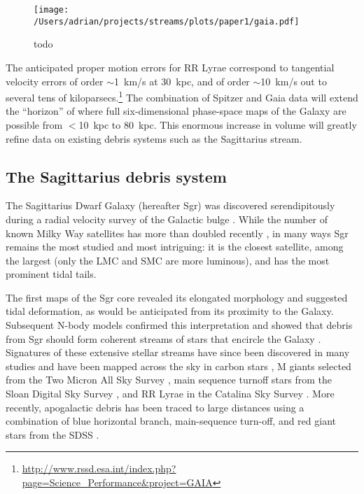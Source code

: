 \documentclass[preprint]{aastex}
\begin{document}
\begin{figure}[h]
\begin{center}
\texttt{[image: /Users/adrian/projects/streams/plots/paper1/gaia.pdf]}
\caption{ todo }\label{fig:gaia_errors}
\end{center}
\end{figure}

The anticipated proper motion errors for RR Lyrae correspond to
tangential velocity errors of order $\sim$1~km/s at 30~kpc, and of
order $\sim$10~km/s out to several tens of
kiloparsecs.\footnote{\url{http://www.rssd.esa.int/index.php?page=Science_Performance&project=GAIA}}
The combination of Spitzer and Gaia data will extend the ``horizon''
of where full six-dimensional phase-space maps of the Galaxy are
possible from $<$10~kpc to 80~kpc. This enormous increase in volume
will greatly refine data on existing debris systems such as the
Sagittarius stream.

\subsection{The Sagittarius debris system}
\label{sec:sgr}
The Sagittarius Dwarf Galaxy (hereafter Sgr) was discovered
serendipitously during a radial velocity survey of the Galactic bulge
\citep{ibata94}. While the number of known Milky Way satellites has
more than doubled recently \citep[e.g.,][]{mcconnachie12}, in many
ways Sgr remains the most studied and most intriguing: it is the
closest satellite, among the largest (only the LMC and SMC are more
luminous), and has the most prominent tidal tails.

The first maps of the Sgr core \citep{ibata94, ibata95} revealed its
elongated morphology and suggested tidal deformation, as would be
anticipated from its proximity to the Galaxy. Subsequent N-body models
confirmed this interpretation \citep{velazquez95} and showed that
debris from Sgr should form coherent streams of stars that encircle
the Galaxy \citep{johnston95}. Signatures of these extensive stellar
streams have since been discovered in many studies and have been
mapped across the sky in carbon stars \citep{totten98}, M giants
selected from the Two Micron All Sky Survey \citep{majewski03}, main
sequence turnoff stars from the Sloan Digital Sky Survey
\citep{belokurov06}, and RR Lyrae in the Catalina Sky Survey
\citep{drake13}. More recently, apogalactic debris has been traced to
large distances using a combination of blue horizontal branch,
main-sequence turn-off, and red giant stars from the SDSS
\citep{belokurov13}.
\end{document}
